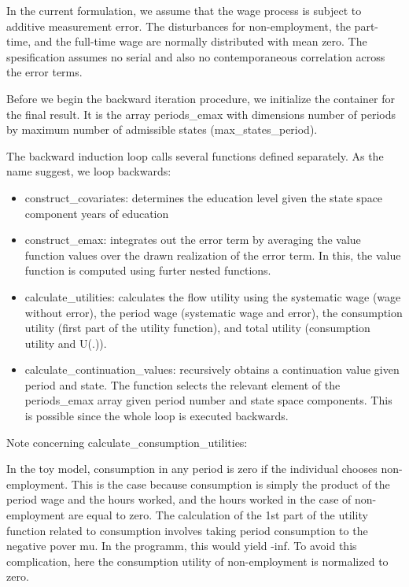 \documentclass[letterpaper,10pt,english]{sphinxmanual}
\begin{document}
In the current formulation, we assume that the wage process is subject to additive measurement error. The disturbances for non-employment, the part-time, and the full-time wage are normally distributed with mean zero. The spesification assumes no serial and also no contemporaneous correlation across the error terms.

Before we begin the backward iteration procedure, we initialize the container for the final result. It is the array periods\_emax with dimensions number of periods by maximum number of admissible states (max\_states\_period).

The backward induction loop calls several functions defined separately. As the name suggest, we loop backwards:
\begin{itemize}
\item {} 
construct\_covariates: determines the education level given the state space component years of education

\item {} 
construct\_emax: integrates out the error term by averaging the value function values over the drawn realization of the error term. In this, the value function is computed using furter nested functions.

\item {} 
calculate\_utilities: calculates the flow utility using the systematic wage (wage without error), the period wage (systematic wage and error), the consumption utility (first part of the utility function), and total utility (consumption utility and U(.)).

\item {} 
calculate\_continuation\_values: recursively obtains a continuation value given period and state. The function selects the relevant element of the periods\_emax array given period number and state space components. This is possible since the whole loop is executed backwards.

\end{itemize}

Note concerning calculate\_consumption\_utilities:

In the toy model, consumption in any period is zero if the individual chooses non-employment. This is the case because consumption is simply the product of the period wage and the hours worked, and the hours worked in the case of non-employment are equal to zero. The calculation of the 1st part of the utility function related to consumption involves taking period consumption to the negative pover mu. In the programm, this would yield -inf. To avoid this complication, here the consumption utility of non-employment is normalized to zero.
\end{document}
